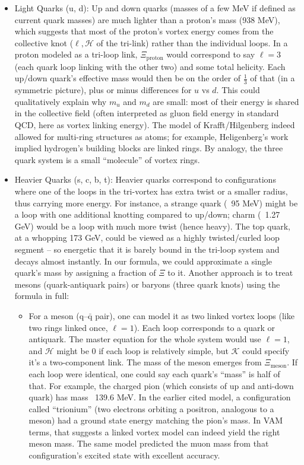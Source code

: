 \begin{itemize}
\item
Light Quarks (u, d): Up and down quarks (masses of a few MeV if defined as current quark masses) are much lighter than a proton’s mass (938 MeV), which suggests that most of the proton’s vortex energy comes from the collective knot ($\ell,\mathcal{H}$ of the tri-link) rather than the individual loops. In a proton modeled as a tri-loop link, $\Xi_{\text{proton}}$ would correspond to say $\ell=3$ (each quark loop linking with the other two) and some total helicity. Each up/down quark’s effective mass would then be on the order of $\frac{1}{3}$ of that (in a symmetric picture), plus or minus differences for $u$ vs $d$. This could qualitatively explain why $m_u$ and $m_d$ are small: most of their energy is shared in the collective field (often interpreted as gluon field energy in standard QCD, here as vortex linking energy). The model of Krafft/Hilgenberg indeed allowed for multi-ring structures as atoms; for example, Heligenberg’s work implied hydrogen’s building blocks are linked rings. By analogy, the three quark system is a small “molecule” of vortex rings.

\item
Heavier Quarks (s, c, b, t): Heavier quarks correspond to configurations where one of the loops in the tri-vortex has extra twist or a smaller radius, thus carrying more energy. For instance, a strange quark (~95 MeV) might be a loop with one additional knotting compared to up/down; charm (~1.27 GeV) would be a loop with much more twist (hence heavy). The top quark, at a whopping 173 GeV, could be viewed as a highly twisted/curled loop segment – so energetic that it is barely bound in the tri-loop system and decays almost instantly. In our formula, we could approximate a single quark’s mass by assigning a fraction of $\Xi$ to it. Another approach is to treat mesons (quark-antiquark pairs) or baryons (three quark knots) using the formula in full:\begin{itemize}

\item
For a meson (q–$\bar{\text{q}}$ pair), one can model it as two linked vortex loops (like two rings linked once, $\ell=1$). Each loop corresponds to a quark or antiquark. The master equation for the whole system would use $\ell=1$, and $\mathcal{H}$ might be 0 if each loop is relatively simple, but $\mathcal{K}$ could specify it’s a two-component link. The mass of the meson emerges from $\Xi_{\text{meson}}$. If each loop were identical, one could say each quark’s “mass” is half of that. For example, the charged pion (which consists of up and anti-down quark) has mass ~139.6 MeV. In the earlier cited model, a configuration called “trionium” (two electrons orbiting a positron, analogous to a meson) had a ground state energy matching the pion’s mass. In VAM terms, that suggests a linked vortex model can indeed yield the right meson mass. The same model predicted the muon mass from that configuration’s excited state with excellent accuracy.


\end{itemize}
\end{itemize}
